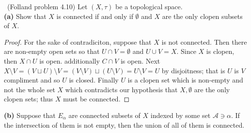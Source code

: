 \documentclass[11pt]{amsart}
\theoremstyle{definition}
\numberwithin{theorem}{section}
\numberwithin{definition}{section}
\numberwithin{equation}{section}
\def\scripta{{\mathcal A}}
\begin{document}
\medskip {}\ (Folland problem 4.10) Let $(X, \tau)$ be a topological space. \\
\textbf{(a)} Show that $X$ is connected if and only if $\emptyset$ and $X$ are the only clopen subsets of $X$.
\begin{proof}
	For the sake of contradiciton, suppose that $X$ is not connected. Then there are non-empty open sets so that $U \cap V = \emptyset$ and $U \cup V = X.$ Since $X$ is clopen, then $X \cap U$ is open. additionally $C \cap V$ is open. Next $X \setminus V = (V \sqcup U) \setminus V = (V \setminus V) \sqcup (U \setminus V) = 
	U \setminus V = U$ by disjoitness; that is $U$ is $V$ compliment and so $U$ is closed. Finally $U$ is a clopen set which is non-empty and not the whole set $X$ which contradicts our hypothesis that $X, \emptyset$ are the only clopen sets; thus $X$ must be connected.
\end{proof}
\noindent \textbf{(b)} Suppose that $E_\alpha$ are connected subsets of $X$ indexed by some set $\scripta\ni \alpha$. If the intersection of them is not empty, then the union of all of them is connected.
\end{document}
